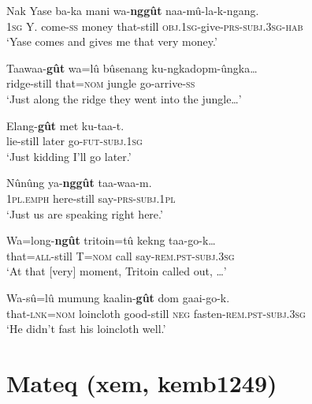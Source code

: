 \begin{exe}
	\ex \label{exAppendixMaMandaRestrictive1}
	\gll Nak Yase ba-ka mani wa-\textbf{nggût} naa-mû-la-k-ngang.\\
	1\textsc{sg} Y. come-\textsc{ss} money that-still \textsc{obj}.1\textsc{sg}-give-\textsc{prs}-\textsc{subj}.3\textsc{sg}-\textsc{hab}\\
	\glt \lq Yase comes and gives me that very money.' \parencite[165]{Pennington2016}

	\ex \label{exAppendixMaMandaRestrictive2}
	\gll Taawaa-\textbf{gût} wa=lû bûsenang ku-ngkadopm-ûngka…\\
	ridge-still that=\textsc{nom} jungle go-arrive-\textsc{ss}\\
	\glt \lq Just along the ridge they went into the jungle…' \parencite[165]{Pennington2016}
	
	\ex \label{exAppendixMaMandaRestrictive3}
	\gll Elang-\textbf{gût} met ku-taa-t.\\
	lie-still later go-\textsc{fut}-\textsc{subj}.1\textsc{sg}\\
	\glt \lq Just kidding I'll go later.'  \parencite[165]{Pennington2016}
	
	\ex \label{exAppendixMaMandaRestrictive4}
	\gll Nûnûng ya-\textbf{nggût} taa-waa-m.\\
	1\textsc{pl}.\textsc{emph} here-still say-\textsc{prs}-\textsc{subj}.1\textsc{pl}\\
	\glt \lq Just us are speaking right here.'   \parencite[152]{Pennington2016}
	
	\ex \label{exAppendixMaMandaRestrictive5}
	\gll Wa=long-\textbf{ngût} tritoin=tû kekng taa-go-k…\\
	that=\textsc{all}-still T=\textsc{nom} call say-\textsc{rem}.\textsc{pst}-\textsc{subj}.3\textsc{sg}\\
	\glt \lq At that [very] moment, Tritoin called out, …' \parencite[165]{Pennington2016}
	
		\ex \label{exAppendixMaMandaRestrictive6}
	\gll Wa-sû=lû mumung kaalin-\textbf{gût} dom gaai-go-k.\\
	that-\textsc{lnk}=\textsc{nom} loincloth good-still \textsc{neg} fasten-\textsc{rem.pst}-\textsc{subj.}3\textsc{sg}\\
	\glt \lq He didn’t fast his loincloth well.' \parencite[164]{Pennington2016}
\end{exe}

\section{Mateq (xem, kemb1249)}
\label{appendixMateq}

